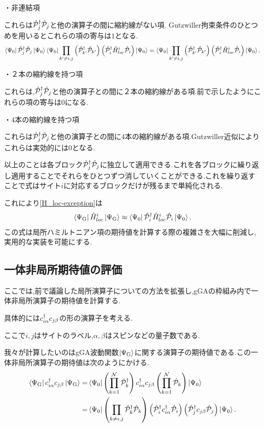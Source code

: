 ・非連結項

これらは$\hat{\mathcal{P}}^\dagger_{j}\hat{\mathcal{P}}_{j}$と他の演算子の間に縮約線がない項.
Gutzwiller拘束条件のひとつめを用いるとこれらの項の寄与は$1$となる.
\begin{equation}
    \Bra{\Psi_{0}}\hat{\mathcal{P}}^\dagger_{j}\hat{\mathcal{P}}_{j}\Ket{\Psi_{0}}\Bra{\Psi_{0}}\prod_{k'\ne i,j}\left( \hat{\mathcal{P}}^\dagger_{k'}\hat{\mathcal{P}}_{k'} \right)\left( \hat{\mathcal{P}}^\dagger_{i}\hat{H}^{i}_{loc}\hat{\mathcal{P}}_{i} \right)\Ket{\Psi_{0}}=\Bra{\Psi_{0}}\prod_{k'\ne i,j}\left( \hat{\mathcal{P}}^\dagger_{k'}\hat{\mathcal{P}}_{k'} \right)\left( \hat{\mathcal{P}}^\dagger_{i}\hat{H}^{i}_{loc}\hat{\mathcal{P}}_{i} \right)\Ket{\Psi_{0}}.
\end{equation}

・２本の縮約線を持つ項

これらは,$\hat{\mathcal{P}}^\dagger_{j}\hat{\mathcal{P}}_{j}$と他の演算子との間に２本の縮約線がある項.前で示したようにこれらの項の寄与は$0$になる.

・4本の縮約線を持つ項

これらは$\hat{\mathcal{P}}^\dagger_{j}\hat{\mathcal{P}}_{j}$と他の演算子との間に4本の縮約線がある項.Gutzwiller近似によりこれらは実効的には$0$となる.

以上のことは各ブロック$\hat{\mathcal{P}}^\dagger_{j}\hat{\mathcal{P}}_{j}$に独立して適用できる.これを各ブロックに繰り返し適用することでそれらをひとつずつ消していくことができる.これを繰り返すことで式はサイト$i$に対応するブロックだけが残るまで単純化される.

これにより\eqref{H_loc-exception}は
\begin{equation}
    \Bra{\Psi_{\text{G}}}\hat{H}^{i}_{loc}\Ket{\Psi_{\text{G}}}\approx \Bra{\Psi_{0}}\hat{\mathcal{P}}^\dagger_{i}\hat{H}^{i}_{loc}\hat{\mathcal{P}}_{i}\Ket{\Psi_{0}}.
\end{equation}
この式は局所ハミルトニアン項の期待値を計算する際の複雑さを大幅に削減し,実用的な実装を可能にする.

\subsection{一体非局所期待値の評価}
ここでは,前で議論した局所演算子についての方法を拡張し,gGAの枠組み内で一体非局所演算子の期待値を計算する.

具体的には$c^\dagger_{i\alpha}c_{j\beta}$の形の演算子を考える.

ここで$i,j$はサイトのラベル,$\alpha,\beta$はスピンなどの量子数である.

我々が計算したいのはgGA波動関数$\Ket{\Psi_{\text{G}}}$に関する演算子の期待値である.この一体非局所演算子の期待値は次のようにかける.
\begin{equation}
\begin{split}
    \Bra{\Psi_{\text{G}}}c^\dagger_{i\alpha}c_{j\beta}\Ket{\Psi_{\text{G}}}=&\Bra{\Psi_{0}}\left( \prod_{k=1}^{\mathcal{N}}\hat{\mathcal{P}}^\dagger_{k} \right)c^\dagger_{i\alpha}c_{j\beta}\left( \prod_{k=1}^{\mathcal{N}}\hat{\mathcal{P}}_{k} \right)\Ket{\Psi_{0}}\\
    =&\Bra{\Psi_{0}}\left( \prod_{k\ne i,j}\hat{\mathcal{P}}^\dagger_{k}\hat{\mathcal{P}}_{k} \right)\left( \hat{\mathcal{P}}^\dagger_{i} c^\dagger_{i\alpha}\hat{\mathcal{P}}_{i}  \right)\left( \hat{\mathcal{P}}^\dagger_{j} c_{j\beta}\hat{\mathcal{P}}_{j} \right)\Ket{\Psi_{0}}.
\end{split}
\end{equation}

